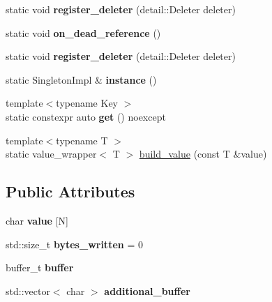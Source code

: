 \begin{CompactItemize}
\item 
\hypertarget{classhope_1_1final_00be6ae22eb41e3315e169c26a19e5cf}{
static void \textbf{register\_\-deleter} (detail::Deleter deleter)}
\label{classhope_1_1final_00be6ae22eb41e3315e169c26a19e5cf}

\item 
\hypertarget{classhope_1_1final_268efe68664b71ead7fb1bcf838bb51f}{
static void \textbf{on\_\-dead\_\-reference} ()}
\label{classhope_1_1final_268efe68664b71ead7fb1bcf838bb51f}

\item 
\hypertarget{classhope_1_1final_00be6ae22eb41e3315e169c26a19e5cf}{
static void \textbf{register\_\-deleter} (detail::Deleter deleter)}
\label{classhope_1_1final_00be6ae22eb41e3315e169c26a19e5cf}

\item 
\hypertarget{classhope_1_1final_715040978b295bca11bd5f396377b138}{
static SingletonImpl \& \textbf{instance} ()}
\label{classhope_1_1final_715040978b295bca11bd5f396377b138}

\item 
\hypertarget{classhope_1_1final_8a5bdf6cd1e21c29f1e3cd9b41fa8d9b}{
{\footnotesize template$<$typename Key $>$ }\\static constexpr auto \textbf{get} () noexcept}
\label{classhope_1_1final_8a5bdf6cd1e21c29f1e3cd9b41fa8d9b}

\item 
{\footnotesize template$<$typename T $>$ }\\static value\_\-wrapper$<$ T $>$ \hyperlink{classhope_1_1final_3c394b218c24c4d9795f84c1d1f0bf2d}{build\_\-value} (const T \&value)
\end{CompactItemize}
\subsection*{Public Attributes}
\begin{CompactItemize}
\item 
\hypertarget{classhope_1_1final_4b912feec93db9aaa7802f82e293d3ae}{
char \textbf{value} \mbox{[}N\mbox{]}}
\label{classhope_1_1final_4b912feec93db9aaa7802f82e293d3ae}

\item 
\hypertarget{classhope_1_1final_c3a87c4cd07b4996bad0ebb85181411b}{
std::size\_\-t \textbf{bytes\_\-written} = 0}
\label{classhope_1_1final_c3a87c4cd07b4996bad0ebb85181411b}

\item 
\hypertarget{classhope_1_1final_43ea140ced19b04247964ae77c219b03}{
buffer\_\-t \textbf{buffer}}
\label{classhope_1_1final_43ea140ced19b04247964ae77c219b03}

\item 
\hypertarget{classhope_1_1final_2d91342662d625ab9acac0ba32f8aaa5}{
std::vector$<$ char $>$ \textbf{additional\_\-buffer}}
\label{classhope_1_1final_2d91342662d625ab9acac0ba32f8aaa5}

\end{CompactItemize}
